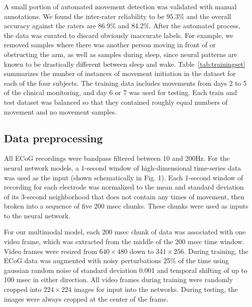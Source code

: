 \documentclass[letterpaper]{article} %
\begin{document}
A small portion of automated movement detection was validated with manual annotations. 
We found the inter-rater reliability to be 95.3\% and the overall accuracy against the raters are 86.9\% and 84.2\%. 
After the automated process, the data was curated to discard obviously inaccurate labels.
For example, we removed samples where there was another person moving in front of or obstructing the arm, as well as samples during sleep, since neural patterns are known to be drastically different between sleep and wake.
Table~\ref{tab:trainingset} summarizes the number of instances of movement initiation in the dataset for each of the four subjects.
The training data includes movements from days 2 to 5 of the clinical monitoring, and day 6 or 7 was used for testing.
Each train and test dataset was balanced so that they contained roughly equal numbers of movement and no movement samples. 

\subsection{Data preprocessing}

All ECoG recordings were bandpass filtered between 10 and 200Hz. 
For the neural network models, a 1-second window of high-dimensional time-series data was used as the input (shown schematically in Fig. 1). Each 1-second window of recording for each electrode was normalized to the mean and standard deviation of its 3-second neighborhood that does not contain any times of movement, then broken into a sequence of five 200 msec chunks. These chunks were used as inputs to the neural network. 

For our multimodal model, each 200 msec chunk of data was associated with one video frame, which was extracted from the middle of the 200 msec time window. Video frames were resized from $640\times480$ down to $341\times256$. During training, the ECoG data was augmented with noisy perturbations 25\% of the time using gaussian random noise of standard deviation 0.001 and temporal shifting of up to 100 msec in either direction. All video frames during training were randomly cropped into $224\times224$ images for input into the networks. During testing, the images were always cropped at the center of the frame. 
\end{document}
